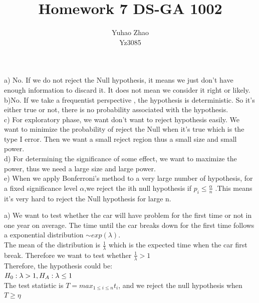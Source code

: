 \documentclass[11pt]{article}
\newenvironment{problem}[2][Problem]{\begin{trivlist}
\item[\hskip \labelsep {\bfseries #1}\hskip \labelsep {\bfseries #2.}]}{\end{trivlist}}
\begin{document}
 
 
\title{Homework 7 DS-GA 1002 }%
\author{Yuhao Zhao\\ %
Yz3085} %
 
\maketitle
\begin{problem}{1}
\end{problem}
a) No. If we do not reject the Null hypothesis, it means we just don't have enough information to discard it. It does not mean we consider it right or likely.\\

b)No. If we take a frequentist perspective , the hypothesis is deterministic. So it's either true or not, there is no probability associated with the hypothesis. \\

c) For exploratory phase, we want don't want to reject hypothesis easily. We want to minimize the probability of reject the Null when it's true which is the type I error. Then we want a small reject region thus a small size and small power. \\

d) For determining the significance of some effect, we want to maximize the power, thus we need a large size and large power.\\

e) When we apply Bonferroni's method to a very large number of hypothesis,  for a fixed significance level $\alpha$,we reject the ith null hypothesis if $p_i \leq \frac{\alpha}{n}$ .This means it's very hard to reject the Null hypothesis for large n.  \\

\begin{problem}{2}
\end{problem}
a) We want to test whether the car will have problem for the first time or not in one year on average. The time until the car breaks down for the first time follows a exponential distribution $\sim exp(\lambda)$.\\ 
The mean of the distribution is $\frac{1}{\lambda}$ which is  the expected time when the car first break. Therefore we want to test whether $\frac{1}{\lambda} >1$\\
Therefore, the hypothesis could be:\\ $H_0: \lambda > 1, \\H_A: \lambda \leq 1$\\
The test statistic is $T = max_{1\leq i\leq n} t_i$, and we reject the null hypothesis when $T\geq \eta$\\
\end{document}
